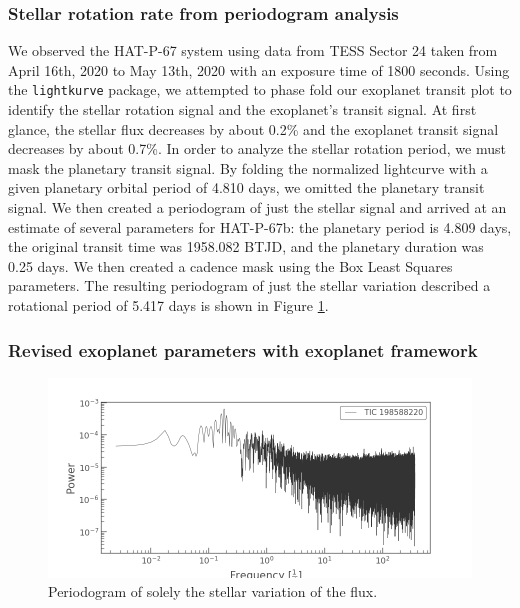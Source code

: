 \documentclass[twocolumn]{aastex631}
\begin{document}
\subsubsection{Stellar rotation rate from periodogram analysis}

We observed the HAT-P-67 system using data from TESS Sector 24 taken from April 16th, 2020 to May 13th, 2020 with an exposure time of 1800 seconds. Using the \texttt{lightkurve} package, we attempted to phase fold our exoplanet transit plot to identify the stellar rotation signal and the exoplanet's transit signal. At first glance, the stellar flux decreases by about 0.2\% and the exoplanet transit signal decreases by about 0.7\%. In order to analyze the stellar rotation period, we must mask the planetary transit signal. By folding the normalized lightcurve with a given planetary orbital period of 4.810 days, we omitted the planetary transit signal. We then created a periodogram of just the stellar signal and arrived at an estimate of several parameters for HAT-P-67b: the planetary period is 4.809 days, the original transit time was 1958.082 BTJD, and the planetary duration was 0.25 days. We then created a cadence mask using the Box Least Squares parameters. The resulting periodogram of just the stellar variation described a rotational period of 5.417 days is shown in Figure \ref{fig:stellar_periodogram}.

\subsubsection{Revised exoplanet parameters with exoplanet framework}

\begin{figure}
    \includegraphics[width=\linewidth]{figures/stellar_periodogram.png}
    \caption{Periodogram of solely the stellar variation of the flux. }
    \label{fig:stellar_periodogram}
\end{figure}
\end{document}
